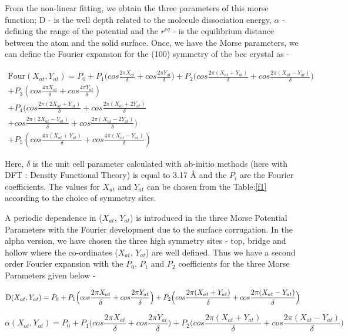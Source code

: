\documentclass[12pt]{article}
\begin{document}
From the non-linear fitting, we obtain the three parameters of this morse function; D - is the well depth related to the molecule dissociation energy, $\alpha$ - defining the range of the potential and the $r^{eq}$ - is the equilibrium distance between the atom and the
solid surface. Once, we have the Morse parameters, we can define the Fourier expansion for the (100) symmetry of the bcc crystal as -


\begin{multline*}
\text{Four}(X_{at},Y_{at}) = P_0 + P_1 \Big( cos \frac{2\pi X_{at}}{\delta} + cos\frac{2\pi Y_{at}}{\delta} \Big) + P_2 \Big( cos \frac{2\pi (X_{at} + Y_{at})}{\delta} + cos\frac{2\pi (X_{at} - Y_{at})}{\delta}\Big) \\
+ P_3 ( cos \frac{4\pi X_{at}}{\delta} + cos\frac{4\pi Y_{at}}{\delta}) \\ + P_4 ( cos \frac{2\pi (2X_{at} + Y_{at})}{\delta} + cos\frac{2\pi (X_{at} +
2Y_{at})}{\delta} \\ + cos \frac{2\pi (2X_{at} - Y_{at})}{\delta} + cos\frac{2\pi (X_{at} - 2Y_{at})}{\delta} ) \\
+ P_5 ( cos \frac{4\pi (X_{at} + Y_{at})}{\delta} + cos\frac{4\pi (X_{at} - Y_{at})}{\delta})
\end{multline*}

Here, $\delta$ is the unit cell parameter calculated with ab-initio methods (here with DFT : Density Functional Theory) is equal to 3.17 \AA \hspace{1mm} and the $P_i$ are the Fourier coefficients. The values for $X_{at}$ and $Y_{at}$ can be chosen from the Table:\ref{f1} according to the choice of symmetry sites.

A periodic dependence in ($X_{at}$, $Y_{at}$) is introduced in the three Morse Potential Parameters with the Fourier development due to the surface corrugation. In the alpha version, we have chosen the three high symmetry sites - top, bridge and hollow where the co-ordinates ($X_{at}$, $Y_{at}$) are well defined. Thus we have a second order Fourier expansion with the $P_0$, $P_1$ and $P_2$ coefficients for the three Morse Parameters given below -

\[
\text D(X_{at},Y_{at}) = P_0 + P_1 \Big( cos \frac{2\pi X_{at}}{\delta} + cos\frac{2\pi Y_{at}}{\delta} \Big) + P_2 \Big( cos \frac{2\pi (X_{at} + Y_{at})}{\delta} + cos\frac{2\pi (X_{at} - Y_{at})}{\delta}\Big) \]

\[
\alpha(X_{at},Y_{at}) = P_0 + P_1 \Big( cos \frac{2\pi X_{at}}{\delta} + cos\frac{2\pi Y_{at}}{\delta} \Big) + P_2 \Big( cos \frac{2\pi (X_{at} + Y_{at})}{\delta} + cos\frac{2\pi (X_{at} - Y_{at})}{\delta}\Big) 
\]
\end{document}
